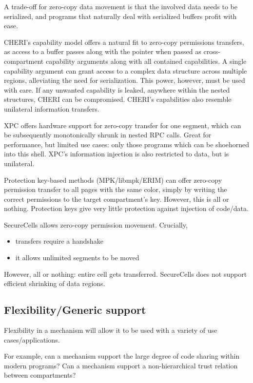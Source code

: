A trade-off for zero-copy data movement is that the involved data needs
to be serialized, and programs that naturally deal with serialized buffers
profit with ease.

CHERI's capability model offers a natural fit to zero-copy permissions 
transfers, as access to a buffer passes along with the pointer when passed
as cross-compartment capability arguments along with all contained 
capabilities.
A single capability argument can grant access to a complex data structure
across multiple regions, alleviating the need for serialization.
This power, however, must be used with care.
If any unwanted capability is leaked, anywhere within the nested structures,
CHERI can be compromised.
CHERI's capabilities also resemble unilateral information transfers.

XPC offers hardware support for zero-copy transfer for one segment, which can
be subsequently monotonically shrunk in nested RPC calls.
Great for performance, but limited use cases: only those programs which can
be shoehorned into this shell.
XPC's information injection is also restricted to data, but is unilateral.

Protection key-based methods (MPK/libmpk/ERIM) can offer zero-copy permission
transfer to all pages with the same color, simply by writing the correct
permissions to the target compartment's key.
However, this is all or nothing.
Protection keys give very little protection against injection of code/data.

SecureCells allows zero-copy permission movement. 
Crucially, 
\begin{itemize}
      \item transfers require a handshake
      \item it allows unlimited segments to be moved
\end{itemize}
However, all or nothing: entire cell gets transferred.
SecureCells does not support efficient shrinking of data regions.

\subsection{Flexibility/Generic support}

Flexibility in a mechanism will allow it to be used with a variety of
use cases/applications.

For example, can a mechanism support the large degree of code sharing
within modern programs?
Can a mechanism support a non-hierarchical trust relation between
compartments?

